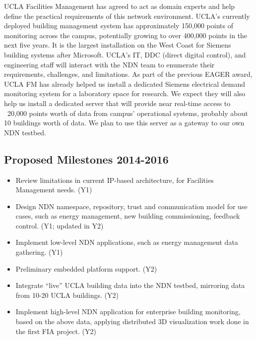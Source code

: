 UCLA Facilities Management has agreed to act as domain experts and help define the practical requirements of this network environment.  UCLA's currently deployed building management system has approximately 150,000 points of monitoring across the campus, potentially growing to over 400,000 points in the next five years.  It is the largest installation on the West Coast for Siemens building systems after Microsoft.  UCLA's IT, DDC (direct digital control), and engineering staff will interact with the NDN team to enumerate their requirements, challenges, and limitations.  As part of the previous EAGER award, UCLA FM has already helped us install a dedicated Siemens electrical demand monitoring system for a laboratory space for research.  We expect they will also help us install a dedicated server that will provide near real-time access to ~20,000 points worth of data from campus' operational systems, probably about 10 buildings worth of data.  We plan to use this server as a gateway to our own NDN testbed. 

\subsection{Proposed Milestones 2014-2016}

\begin{itemize}
\item Review limitations in current IP-based architecture, for Facilities Management needs. (Y1)
\item Design NDN namespace, repository, trust and communication model for use cases, such as energy management, new building commissioning, feedback control. (Y1; updated in Y2)
\item Implement low-level NDN applications, such as energy management data gathering. (Y1)
\item Preliminary embedded platform support. (Y2)
\item Integrate “live” UCLA building data into the NDN testbed, mirroring data from 10-20 UCLA buildings. (Y2)
\item Implement high-level NDN application for enterprise building monitoring, based on the above data, applying distributed 3D visualization work done in the first FIA project. (Y2)
\end{itemize}


